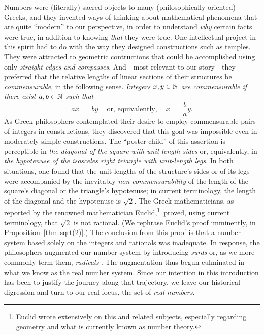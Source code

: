 Numbers were (literally) sacred objects to many (philosophically
oriented) Greeks, and they invented ways of thinking about
mathematical phenomena that are quite ``modern'' to our perspective,
in order to understand {\em why} certain facts were true, in addition
to knowing {\em that} they were true.  One intellectual project in
this spirit had to do with the way they designed constructions such as
temples.  They were attracted to geometric contructions that could be
accomplished using only {\em straight-edges and compasses}.
And---most relevant to our story---they preferred that the relative
lengths of linear sections of their structures be {\em commensurable},
 in the
following sense.  {\em Integers $x,y \in \mathbb{N}$ are {\em commensurable}
  if there exist $a, b \in \mathbb{N}$ such that}
\[ 
ax \ = \ by \ \ \ \ \mbox{ or, equivalently, } \ \ \ \ x \ = \ \frac{b}{a} y.
\]
As Greek philosophers contemplated their desire to employ
commensurable pairs of integers in constructions, they discovered that
this goal was impossible even in moderately simple constructions.  The
``poster child'' of this assertion is perceptible in {\it the diagonal
  of the square with unit-length sides} or, equivalently, in {\it the
  hypotenuse of the isosceles right triangle with unit-length legs}.
In both situations, one found that the unit lengths of the structure's
sides or of its legs were accompanied by the inevitably {\em
  non-commensurability} of the length of the square's diagonal or the
triangle's hypotenuse; in current terminology, the length of the
diagonal and the hypotenuse is $\sqrt{2}$.  The Greek mathematicians,
as reported by the renowned mathematician
Euclid,\footnote{Euclid wrote extensively on this and related
  subjects, especially regarding geometry and what is currently known
  as number theory.}~proved, using current terminology, that $\sqrt{2}$
is not rational.  (We rephrase Euclid's proof imminently, in
Proposition~\ref{thm:sqrt(2)}.)  The conclusion from this proof is
that a number system based solely on the integers and rationals was
inadequate.  In response, the philosophers augmented our number system
by introducing {\it surds}  or, as we more commonly
term them, {\it radicals} .  The augmentation
thus begun culminated in what we know as the real number system.
Since our intention in this introduction has been to justify the
journey along that trajectory, we leave our historical digression and
turn to our real focus, the set of {\it real numbers}.

